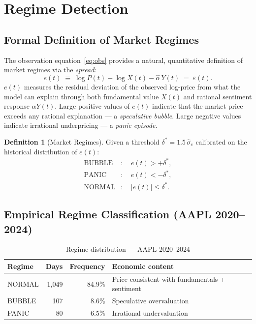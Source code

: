 \documentclass[12pt,a4paper]{article}
\theoremstyle{definition}
\newtheorem{definition}[theorem]{Definition}
\theoremstyle{remark}
\begin{document}
\section{Regime Detection}
\label{sec:regime}

\subsection{Formal Definition of Market Regimes}

The observation equation~\eqref{eq:obs} provides a natural, quantitative
definition of market regimes via the \emph{spread}:
\begin{equation}
  e(t) \;\equiv\; \log P(t) - \log X(t) - \hat{\alpha}\,Y(t)
  \;=\; \varepsilon(t).
  \label{eq:spread}
\end{equation}
$e(t)$ measures the residual deviation of the observed log-price from
what the model can explain through both fundamental value $X(t)$ and
rational sentiment response $\alpha Y(t)$. Large positive values of
$e(t)$ indicate that the market price exceeds any rational explanation
--- a \emph{speculative bubble}. Large negative values indicate
irrational underpricing --- a \emph{panic episode}.

\begin{definition}[Market Regimes]
  Given a threshold $\delta^* = 1.5\,\hat{\sigma}_e$ calibrated on the
  historical distribution of $e(t)$:
  \begin{align}
    \text{BUBBLE}  &: \quad e(t) > +\delta^*, \\
    \text{PANIC}   &: \quad e(t) < -\delta^*, \\
    \text{NORMAL}  &: \quad |e(t)| \leq \delta^*.
  \end{align}
\end{definition}

\subsection{Empirical Regime Classification (AAPL 2020--2024)}

\begin{table}[H]
  \centering
  \caption{Regime distribution --- AAPL 2020--2024}
  \label{tab:regimes}
  \begin{tabular}{lrrl}
    \toprule
    Regime & Days & Frequency & Economic content \\
    \midrule
    NORMAL & 1{,}049 & 84.9\% &
      Price consistent with fundamentals + sentiment \\
    BUBBLE &    107 &  8.6\% &
      Speculative overvaluation \\
    PANIC  &     80 &  6.5\% &
      Irrational undervaluation \\
    \bottomrule
  \end{tabular}
\end{table}
\end{document}
